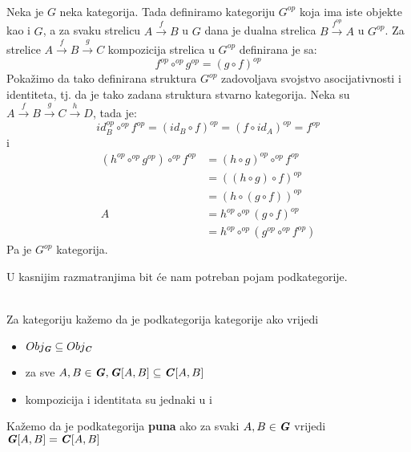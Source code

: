 	\begin{example}\ \\
	
    \noindent Neka je $G$ neka kategorija. Tada definiramo kategoriju $G^{op}$ koja ima
    iste objekte kao i $G$, a za svaku strelicu $A \xrightarrow{f} B$ u $G$ 
    dana je dualna strelica $B \xrightarrow{f^{op}} A$ u $G^{op}$.
    Za strelice $A \xrightarrow{f} B \xrightarrow{g} C$ kompozicija strelica
    u $G^{op}$ definirana je sa:
    \begin{equation*}
      f^{op} \circ^{op} g^{op} = (g \circ f)^{op}
    \end{equation*}
    Pokažimo da tako definirana struktura $G^{op}$ zadovoljava svojstvo
    asocijativnosti i identiteta, tj. da je tako zadana struktura stvarno
    kategorija.
    Neka su $A \xrightarrow{f} B \xrightarrow{g} C \xrightarrow{h} D$, tada je:
    \begin{equation*}
      id^{op}_B \circ^{op} f^{op} = (id_B \circ f)^{op} = (f \circ id_A)^{op} =
      f^{op}
    \end{equation*}
    i
    \begin{align*}
      (h^{op} \circ^{op} g^{op}) \circ^{op} f^{op} &= (h \circ g)^{op} \circ^{op} f^{op}\\
      &= ((h \circ g) \circ f)^{op}\\
      &= (h \circ (g \circ f))^{op}\\
      A
      &= h^{op} \circ^{op} (g \circ f)^{op}\\
      &= h^{op} \circ^{op} (g^{op} \circ^{op} f^{op})
    \end{align*}
    Pa je $G^{op}$ kategorija.\\
\end{example}

\noindent U kasnijim razmatranjima bit će nam potreban pojam podkategorije.\\

  \begin{definition}\ \\
  
   \noindent Za kategoriju  kažemo da je podkategorija kategorije
     ako vrijedi
    \begin{itemize}
      \item $Obj_{\textbf{\emph{G}}} \subseteq Obj_{\textbf{\emph{C}}}$
      \item za sve $A, B \in \textbf{\emph{G}}, \textbf{\emph{G}}[A, B] \subseteq
        \textbf{\emph{C}}[A, B]$
      \item kompozicija i identitata su jednaki u  i 
    \end{itemize}
    Kažemo da je podkategorija \textbf{puna} ako za svaki $A, B \in \textbf{\emph{G}}$ vrijedi
    $\textbf{\emph{G}}[A, B] = \textbf{\emph{C}}[A, B]$\\
    
  \end{definition}
  
